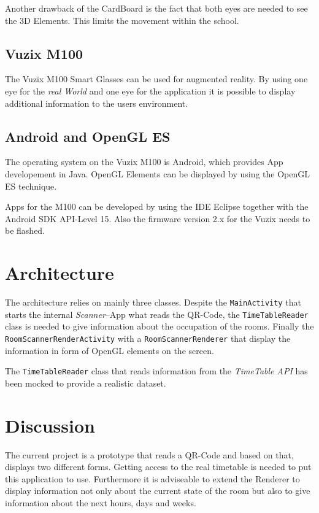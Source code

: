 \documentclass[11pt]{scrartcl}
\begin{document}
\begin{multicols}{2}
			Another drawback of the CardBoard is the fact that both eyes are needed to see the 3D Elements. This limits the movement within the school.   
		
		\subsection{Vuzix M100}
			The Vuzix M100 Smart Glasses can be used for augmented reality. By using one eye for the \emph{real World} and one eye for the application it is possible to display additional information to the users environment.
		
		\subsection{Android and OpenGL ES}
			The operating system on the Vuzix M100 is Android, which provides App developement in Java. OpenGL Elements can be displayed by using the OpenGL ES technique.
	
			Apps for the M100 can be developed by using the IDE Eclipse together with the Android SDK API-Level 15. Also the firmware version 2.x for the Vuzix needs to be flashed.

	\section{Architecture}
		The architecture relies on mainly three classes. Despite the \texttt{MainActivity} that starts the internal \emph{Scanner}--App what reads the QR-Code, the \texttt{TimeTableReader} class is needed to give information about the occupation of the rooms. Finally the \texttt{RoomScannerRenderActivity} with a \texttt{RoomScannerRenderer} that display the information in form of OpenGL elements on the screen.
		
		The \texttt{TimeTableReader} class that reads information from the \emph{TimeTable API} has been mocked to provide a realistic dataset.
		
	\section{Discussion}
		The current project is a prototype that reads a QR-Code and based on that, displays two different forms. Getting access to the real timetable is needed to put this application to use. Furthermore it is adviseable to extend the Renderer to display information not only about the current state of the room but also to give information about the next hours, days and weeks.
		

\end{multicols}
\end{document}
